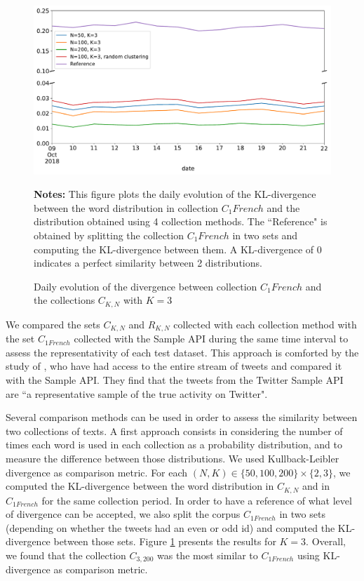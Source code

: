 \begin{figure}
\begin{center}
\includegraphics[scale=.5]{figures/KL_K=3.pdf}
\end{center}
{\scriptsize \textbf{Notes:} This figure plots the daily evolution of the KL-divergence between the word distribution in collection $C_1 French$ and the distribution obtained using 4 collection methods. The ``Reference" is obtained by splitting the collection $C_1 French$ in two sets and computing the KL-divergence between them. A KL-divergence of 0 indicates a perfect similarity between 2 distributions.}
\caption{Daily evolution of the divergence between collection $C_1 French$ and the collections $C_{K,N}$ with $K = 3$}
\label{Figure:KL_K=3}
\end{figure}

We compared the sets $C_{K,N}$ and $R_{K,N}$ collected with each collection method with the set $C_{1 French}$ collected with the Sample API during the same time interval to assess the representativity of each test dataset. This approach is comforted by the study of \citet{morstatter_when_2014}, who have had access to the entire stream of tweets and compared it with the Sample API. They find that the tweets from the Twitter Sample API are ``a representative sample of the true activity on Twitter".  


Several comparison methods can be used in order to assess the similarity between two collections of texts. A first approach consists in considering the number of times each word is used in each collection as a probability distribution, and to measure the difference between those distributions. We used Kullback-Leibler divergence \citep{kullback_information_1997} as comparison metric. For each $(N,K) \in  \{50, 100, 200\} \times \{2,3\}$, we computed the KL-divergence between the word distribution in $C_{K,N}$ and in $C_{1 French}$ for the same collection period. In order to have a reference of what level of divergence can be accepted, we also split the corpus $C_{1 French}$ in two sets (depending on whether the tweets had an even or odd id) and computed the KL-divergence between those sets. Figure \ref{Figure:KL_K=3} presents the results for $K=3$. Overall, we found that the collection $C_{3,200}$ was the most similar to $C_{1 French}$ using KL-divergence as comparison metric.


